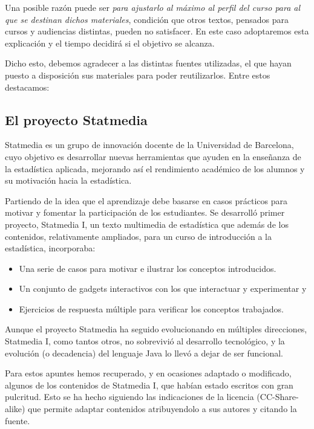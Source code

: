 \documentclass[
]{article}
\providecommand{\tightlist}{%
  \setlength{\itemsep}{0pt}\setlength{\parskip}{0pt}}
\begin{document}
Una posible razón puede ser \emph{para ajustarlo al máximo al perfil del curso para al que se destinan dichos materiales}, condición que otros textos, pensados para cursos y audiencias distintas, pueden no satisfacer. En este caso adoptaremos esta explicación y el tiempo decidirá si el objetivo se alcanza.

Dicho esto, debemos agradecer a las distintas fuentes utilizadas, el que hayan puesto a disposición sus materiales para poder reutilizarlos. Entre estos destacamos:

\subsection*{El proyecto Statmedia}\label{el-proyecto-statmedia}

Statmedia es un grupo de innovación docente de la Universidad de Barcelona, cuyo objetivo es desarrollar nuevas herramientas que ayuden en la enseñanza de la estadística aplicada, mejorando así el rendimiento académico de los alumnos y su motivación hacia la estadística.

Partiendo de la idea que el aprendizaje debe basarse en casos prácticos para motivar y fomentar la participación de los estudiantes. Se desarrolló primer proyecto, Statmedia I, un texto multimedia de estadística que además de los contenidos, relativamente ampliados, para un curso de introducción a la estadística, incorporaba:

\begin{itemize}
\tightlist
\item
  Una serie de casos para motivar e ilustrar los conceptos introducidos.
\item
  Un conjunto de gadgets interactivos con los que interactuar y experimentar y
\item
  Ejercicios de respuesta múltiple para verificar los conceptos trabajados.
\end{itemize}

Aunque el proyecto Statmedia ha seguido evolucionando en múltiples direcciones, Statmedia I, como tantos otros, no sobrevivió al desarrollo tecnológico, y la evolución (o decadencia) del lenguaje Java lo llevó a dejar de ser funcional.

Para estos apuntes hemos recuperado, y en ocasiones adaptado o modificado, algunos de los contenidos de Statmedia I, que habían estado escritos con gran pulcritud. Esto se ha hecho siguiendo las indicaciones de la licencia (CC-Share-alike) que permite adaptar contenidos atribuyendolo a sus autores y citando la fuente.
\end{document}
